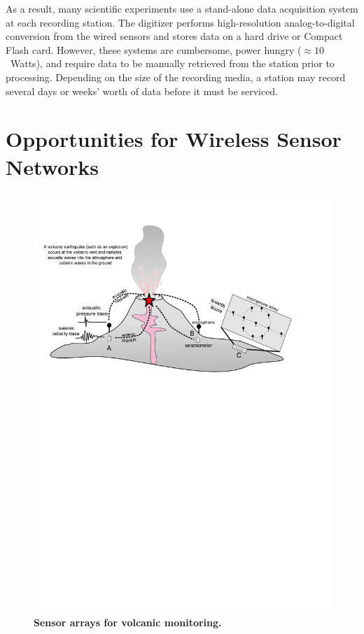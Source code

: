 As a result, many scientific experiments use a stand-alone data acquisition
system at each recording station. The digitizer performs high-resolution
analog-to-digital conversion from the wired sensors and stores data on a hard
drive or Compact Flash card. However, these systems are cumbersome, power
hungry ($\approx 10$~Watts), and require data to be manually retrieved from
the station prior to processing. Depending on the size of the recording
media, a station may record several days or weeks' worth of data before it
must be serviced.

\section{Opportunities for Wireless Sensor Networks}

\begin{figure}[t] 
\begin{center} 
\includegraphics[width=0.9\hsize,clip=true,bb=20 470 540 770]{./2-related/figs/Cartoon2.pdf}
\end{center} 
\caption{\textbf{Sensor arrays for volcanic monitoring.}}
\label{introduction-fig-cartoon} 
\end{figure}

